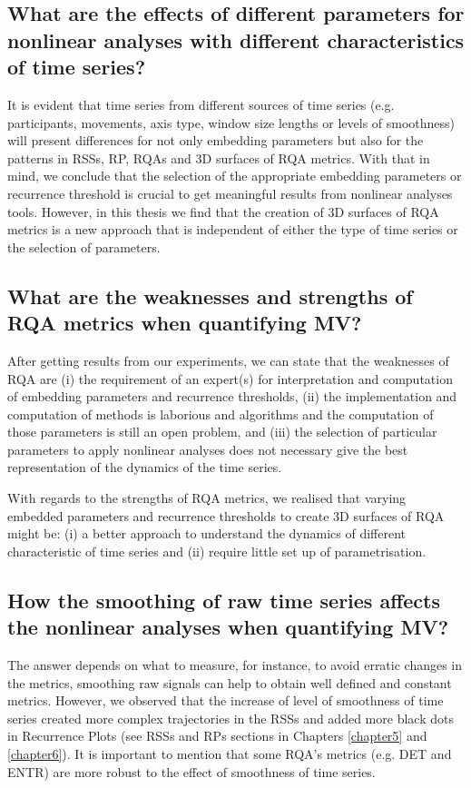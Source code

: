 \subsection*{What are the effects 
	of different parameters for nonlinear analyses 
	with different characteristics of time series?}

It is evident that time series from different sources 
of time series (e.g. participants, movements, axis type, window size lengths 
or levels of smoothness) will present differences for not only
embedding parameters but also for the patterns in RSSs, RP, RQAs 
and 3D surfaces of RQA metrics.
With that in mind, we conclude that the selection of the appropriate
embedding parameters or recurrence threshold is crucial to get 
meaningful results from nonlinear analyses tools. However, in this 
thesis we find that the creation of 3D surfaces of RQA metrics is 
a new approach that is independent of either the type of time series
or the selection of parameters.


\subsection*{What are the weaknesses and strengths of RQA metrics 
	when quantifying MV?}


After getting results from our experiments, we can state that the 
weaknesses of RQA are (i) the requirement of an expert(s) for 
interpretation and computation of embedding parameters and 
recurrence thresholds,  
(ii) the implementation and computation of methods is 
laborious and algorithms and the computation of those parameters 
is still an open problem, and 
(iii) the selection of particular parameters to apply nonlinear analyses 
does not necessary give the best representation of the dynamics of 
the time series.

With regards to the strengths of RQA metrics, we realised that varying 
embedded parameters and recurrence thresholds to create 3D surfaces 
of RQA might be: 
(i) a better approach to understand the dynamics of different 
characteristic of time series and
(ii) require little set up of parametrisation.


\subsection*{How the smoothing of raw time series affects the 
	nonlinear analyses when quantifying MV?}

The answer depends on what to measure, for instance, to 
avoid erratic changes in the metrics, smoothing raw signals can help
to obtain well defined and constant metrics.
However, we observed that the increase of level of smoothness 
of time series created more complex trajectories in the RSSs and 
added more black dots in Recurrence Plots 
(see RSSs and RPs sections in Chapters \ref{chapter5} and \ref{chapter6}).
It is important to mention that some RQA's metrics (e.g. DET and  ENTR) 
are more robust to the effect of smoothness of time series.

